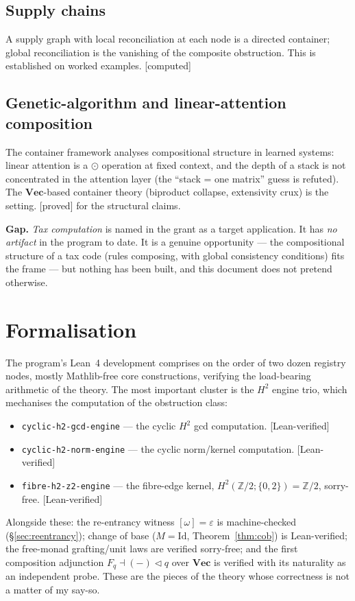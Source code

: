 \documentclass[11pt]{article}
\theoremstyle{plain}
\theoremstyle{definition}
\theoremstyle{remark}
\renewcommand{\Vec}{\mathbf{Vec}}
\newcommand{\omegacl}{[\omega]}
\newcommand{\HH}[1]{H^{#1}}
\newcommand{\Id}{\mathrm{Id}}
\newcommand{\grade}[1]{{\small\textsf{[#1]}}}
\newcommand{\gLean}{\grade{Lean-verified}}
\newcommand{\gProved}{\grade{proved}}
\newcommand{\gComputed}{\grade{computed}}
\begin{document}
\subsection{Supply chains}\label{sec:supply}
A supply graph with local reconciliation at each node is a directed container; global
reconciliation is the vanishing of the composite obstruction. This is established on
worked examples. \gComputed{}

\subsection{Genetic-algorithm and linear-attention composition}\label{sec:ga}
The container framework analyses compositional structure in learned systems: linear
attention is a $\odot$ operation at fixed context, and the depth of a stack is not
concentrated in the attention layer (the ``stack = one matrix'' guess is refuted). The
$\Vec$-based container theory (biproduct collapse, extensivity crux) is the setting.
\gProved{} for the structural claims.

\medskip
\noindent\textbf{Gap.} \emph{Tax computation} is named in the grant as a target
application. It has \emph{no artifact} in the program to date. It is a genuine opportunity
--- the compositional structure of a tax code (rules composing, with global consistency
conditions) fits the frame --- but nothing has been built, and this document does not
pretend otherwise.

\section{Formalisation}\label{sec:formalisation}

The program's Lean~4 development comprises on the order of two dozen registry nodes,
mostly Mathlib-free core constructions, verifying the load-bearing arithmetic of the
theory. The most important cluster is the $\HH{2}$ engine trio, which mechanises the
computation of the obstruction class:
\begin{itemize}[nosep]
  \item \texttt{cyclic-h2-gcd-engine} --- the cyclic $\HH{2}$ gcd computation. \gLean{}
  \item \texttt{cyclic-h2-norm-engine} --- the cyclic norm/kernel computation. \gLean{}
  \item \texttt{fibre-h2-z2-engine} --- the fibre-edge kernel, $\HH{2}(\mathbb{Z}/2;
    \{0,2\}) = \mathbb{Z}/2$, sorry-free. \gLean{}
\end{itemize}
Alongside these: the re-entrancy witness $\omegacl = \varepsilon$ is machine-checked
(\S\ref{sec:reentrancy}); change of base ($M=\Id$, Theorem~\ref{thm:cob}) is
Lean-verified; the free-monad grafting/unit laws are verified sorry-free; and the
first composition adjunction $F_q \dashv (-)\triangleleft q$ over $\Vec$ is verified with
its naturality as an independent probe. These are the pieces of the theory whose
correctness is not a matter of my say-so.
\end{document}
